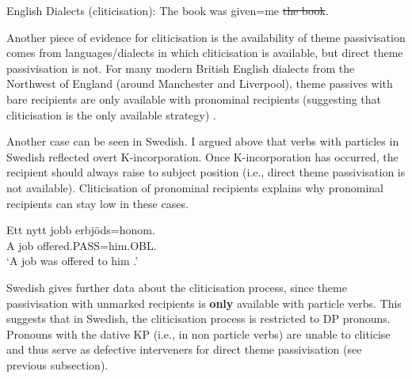 {\begin{exe}
	\ex English Dialects (cliticisation): The book was given=me \sout{the book}.
\end{exe}

Another piece of evidence for cliticisation is the availability of theme passivisation comes from languages/dialects in which cliticisation is available, but direct theme passivisation is not. For many modern British English dialects from the Northwest of England (around Manchester and Liverpool), theme passives with bare recipients are only available with pronominal recipients (suggesting that cliticisation is the only available strategy) \citep{Haddican.2010,Myler.2011,Haddican.2012,Biggs.2015}.

\begin{exe}
	\ex
	\begin{xlist}
	\end{xlist}
\end{exe}

Another case can be seen in Swedish. I argued above that verbs with particles in Swedish reflected overt K-incorporation. Once K-incorporation has occurred, the recipient should always raise to subject position (i.e., direct theme passivisation is not available). Cliticisation of pronominal recipients explains why pronominal recipients can stay low in these cases.

\begin{exe}
	\ex \gll Ett nytt jobb erbjöds=honom.\\
A job offered.PASS=him.OBL.\\
\trans `A job was offered to him \citep{Anward.1989,Falk.1990,Lundquist.2006}.'
\end{exe}

Swedish gives further data about the cliticisation process, since theme passivisation with unmarked recipients is \textbf{only} available with particle verbs. This suggests that in Swedish, the cliticisation process is restricted to DP pronouns. Pronouns with the dative KP (i.e., in non particle verbs) are unable to cliticise and thus serve as defective interveners for direct theme passivisation (see previous subsection).

\begin{exe}
\end{exe}

}
